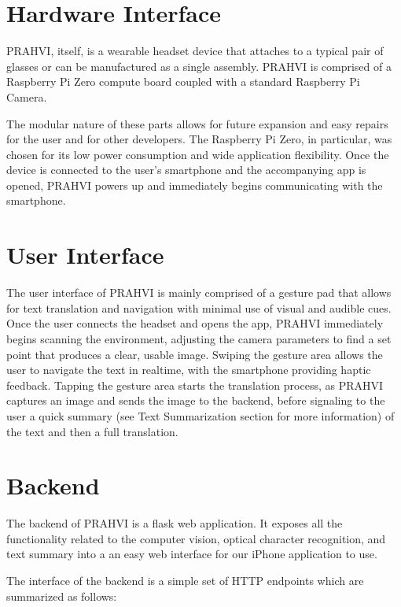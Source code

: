 \section{Hardware Interface}
PRAHVI, itself, is a wearable headset device that attaches to a typical pair of glasses or can be manufactured as a single assembly. PRAHVI is comprised of a Raspberry Pi Zero compute board coupled with a standard Raspberry Pi Camera.

The modular nature of these parts allows for future expansion and easy repairs for the user and for other developers. The Raspberry Pi Zero, in particular, was chosen for its low power consumption and wide application flexibility. Once the device is connected to the user's smartphone and the accompanying app is opened, PRAHVI powers up and immediately begins communicating with the smartphone.

\section{User Interface}
The user interface of PRAHVI is mainly comprised of a gesture pad that allows for text translation and navigation with minimal use of visual and audible cues. Once the user connects the headset and opens the app, PRAHVI immediately begins scanning the environment, adjusting the camera parameters to find a set point that produces a clear, usable image. Swiping the gesture area allows the user to navigate the text in realtime, with the smartphone providing haptic feedback. Tapping the gesture area starts the translation process, as PRAHVI captures an image and sends the image to the backend, before signaling to the user a quick summary (see Text Summarization section for more information) of the text and then a full translation.

\section{Backend}
The backend of PRAHVI is a flask web application. It exposes all the functionality related to the computer vision, optical character recognition, and text summary into a an easy web interface for our iPhone application to use.

The interface of the backend is a simple set of HTTP endpoints which are summarized as follows:

